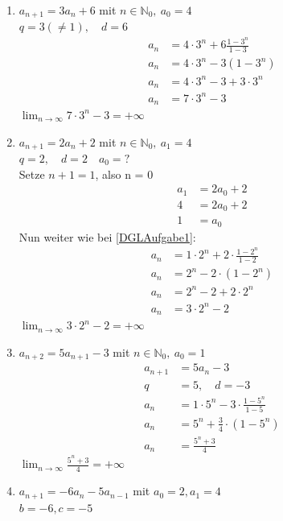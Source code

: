 \documentclass[11pt, a4paper]{article}
\begin{document}
\begin{enumerate}
	\item $a_{n+1} = 3 a_n + 6$ mit $n \in \mathbb{N}_0,\ a_0 = 4$ \label{DGLAufgabe1} \\
		$q=3 (\neq 1), \quad d=6$ \\
		\begin{align*}
			a_n &= 4 \cdot 3^n + 6 \frac{1-3^n}{1-3} \\
			a_n &= 4 \cdot 3^n - 3 (1-3^n) \\
			a_n &= 4 \cdot 3^n - 3 + 3 \cdot 3^n \\
			a_n &= 7 \cdot 3^n - 3 \tag{Explizite Darstellung}
		\end{align*}
		$\lim_{n \rightarrow \infty} 7 \cdot 3^n - 3 = +\infty$
	\item $a_{n+1} = 2 a_n +2$ mit $n \in \mathbb{N}_0,\ a_1 = 4$ \\
		$q=2, \quad d=2 \quad a_0 = ?$ \\
		Setze $n+1 = 1$, also n = 0
		\begin{align*}
			a_1 &= 2 a_0 +2 \\
			4 &= 2 a_0 +2 \\
			1 &= a_0
		\end{align*}
		Nun weiter wie bei \ref{DGLAufgabe1}:
		\begin{align*}
			a_n &= 1 \cdot 2^n + 2 \cdot \frac{1-2^n}{1-2} \\
			a_n &= 2^n - 2 \cdot \left( 1-2^n \right) \\
			a_n &= 2^n - 2 + 2 \cdot 2^n \\
			a_n &= 3 \cdot 2^n - 2
		\end{align*}
		$\lim_{n \rightarrow \infty} 3 \cdot 2^n - 2 = +\infty$
	\item $a_{n+2} = 5 a_{n+1} - 3$ mit $n \in \mathbb{N}_0,\ a_0 = 1$ \\
		\begin{align*}
			a_{n+1} &= 5 a_{n} - 3 \tag{Index-Shift} \\
			q &= 5, \quad d = -3 \\
			a_n &= 1 \cdot 5^n -3 \cdot \frac{1-5^n}{1-5} \\
			a_n &= 5^n + \frac{3}{4} \cdot (1-5^n) \\
			a_n &= \frac{5^n+3}{4}
		\end{align*}
		$\lim_{n \rightarrow \infty} \frac{5^n+3}{4} = +\infty$
	\item $a_{n+1} = -6 a_{n} - 5 a_{n-1}$ mit $a_0=2, a_1=4$ \\
		$b=-6, c=-5$ \\

\end{enumerate}
\end{document}
